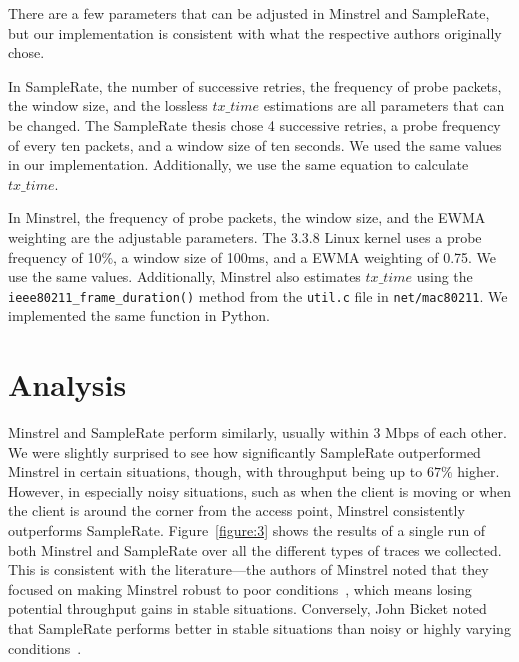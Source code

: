 \documentclass[twocolumn,10pt]{article}
\begin{document}
There are a few parameters that can be adjusted in Minstrel and
SampleRate, but our implementation is consistent with what the
respective authors originally chose.

In SampleRate, the number of successive retries, the frequency of
probe packets, the window size, and the lossless $tx\_time$
estimations are all parameters that can be changed.  The SampleRate
thesis chose 4 successive retries, a probe frequency of every ten
packets, and a window size of ten seconds.  We used the same values in
our implementation.  Additionally, we use the same equation to
calculate $tx\_time$.

In Minstrel, the frequency of probe packets, the window size, and the
EWMA weighting are the adjustable parameters.  The 3.3.8 Linux kernel
uses a probe frequency of 10\%, a window size of 100ms, and a EWMA
weighting of 0.75.  We use the same values.  Additionally, Minstrel
also estimates $tx\_time$ using the \verb|ieee80211_frame_duration()|
method from the \texttt{util.c} file in \texttt{net/mac80211}.  We
implemented the same function in Python.


\section{Analysis} \label{sec:analysis}

Minstrel and SampleRate perform similarly, usually within 3 Mbps of
each other.  We were slightly surprised to
see how significantly SampleRate outperformed Minstrel in certain
situations, though, with throughput being up to $67\%$ higher.
However, in especially noisy situations, such as when the client
is moving or when the client is around the corner from the access
point, Minstrel consistently outperforms SampleRate.
Figure~\ref{figure:3} shows the results of a single run of both
Minstrel and SampleRate over all the different types of traces we
collected.  This is consistent with the literature---the authors of
Minstrel noted that they focused on making Minstrel robust to poor
conditions~\cite{minstrel}, which means losing potential throughput
gains in stable situations.  Conversely, John Bicket noted that
SampleRate performs better in stable situations than noisy or highly
varying conditions~\cite{samplerate}.  
\end{document}
